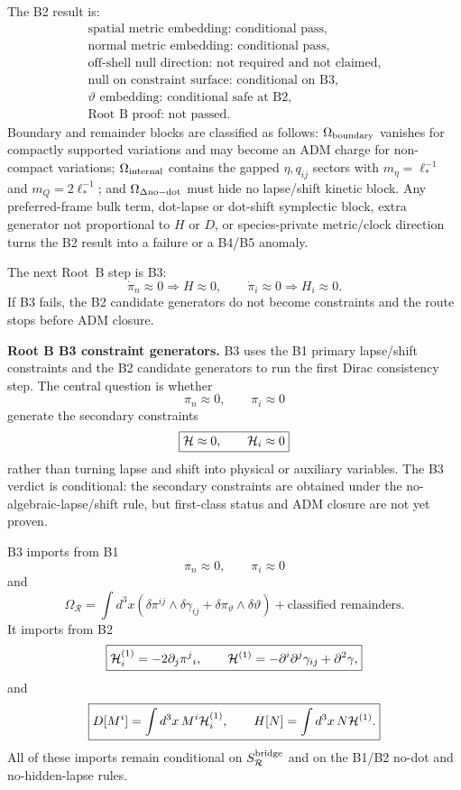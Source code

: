 \documentclass[11pt]{article}
\begin{document}
The B2 result is:
\[
\boxed{
\begin{gathered}
\text{spatial metric embedding: conditional pass},\\
\text{normal metric embedding: conditional pass},\\
\text{off-shell null direction: not required and not claimed},\\
\text{null on constraint surface: conditional on B3},\\
\vartheta\text{ embedding: conditional safe at B2},\\
\text{Root~B proof: not passed.}
\end{gathered}
}
\]
Boundary and remainder blocks are classified as follows: \(\Omega_{\rm boundary}\)
vanishes for compactly supported variations and may become an ADM charge for
non-compact variations; \(\Omega_{\rm internal}\) contains the gapped
\(\eta,q_{ij}\) sectors with \(m_\eta=\ell_*^{-1}\) and
\(m_Q=2\ell_*^{-1}\); and \(\Omega_{\Delta{\rm no-dot}}\) must hide no
lapse/shift kinetic block.  Any preferred-frame bulk term, dot-lapse or
dot-shift symplectic block, extra generator not proportional to \(H\) or
\(D\), or species-private metric/clock direction turns the B2 result into a
failure or a B4/B5 anomaly.

The next Root~B step is B3:
\[
\boxed{
\dot\pi_n\approx0\Rightarrow H\approx0,\qquad
\dot\pi_i\approx0\Rightarrow H_i\approx0.
}
\]
If B3 fails, the B2 candidate generators do not become constraints and the
route stops before ADM closure.

\medskip\noindent\textbf{Root B B3 constraint generators.}
B3 uses the B1 primary lapse/shift constraints and the B2 candidate
generators to run the first Dirac consistency step.  The central question is
whether
\[
\boxed{\pi_n\approx0,\qquad \pi_i\approx0}
\]
generate the secondary constraints
\[
\boxed{{\cal H}\approx0,\qquad {\cal H}_i\approx0}
\]
rather than turning lapse and shift into physical or auxiliary variables.  The
B3 verdict is conditional: the secondary constraints are obtained under the
no-algebraic-lapse/shift rule, but first-class status and ADM closure are not
yet proven.

B3 imports from B1
\[
\boxed{\pi_n\approx0,\qquad \pi_i\approx0}
\]
and
\[
\boxed{
\Omega_{\mathcal R}
=\int d^3x\left(
\delta\pi^{ij}\wedge\delta\gamma_{ij}
+\delta\pi_\vartheta\wedge\delta\vartheta
\right)+\text{classified remainders}.
}
\]
It imports from B2
\[
\boxed{
{\cal H}_i^{(1)}=-2\partial_j\pi^j{}_i,\qquad
{\cal H}^{(1)}=-\partial^i\partial^j\gamma_{ij}+\partial^2\gamma,
}
\]
and
\[
\boxed{
D[M^i]=\int d^3x\,M^i{\cal H}_i^{(1)},\qquad
H[N]=\int d^3x\,N{\cal H}^{(1)}.
}
\]
All of these imports remain conditional on \(S_{\mathcal R}^{\rm bridge}\)
and on the B1/B2 no-dot and no-hidden-lapse rules.
\end{document}
